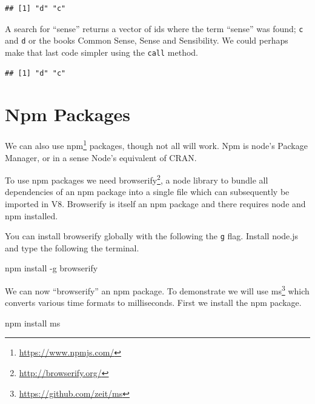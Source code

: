 \documentclass[
]{krantz}
\makeatletter
\newenvironment{Shaded}{\begin{snugshade}}{\end{snugshade}}
\newcommand{\ExtensionTok}[1]{#1}
\newcommand{\KeywordTok}[1]{\textcolor[rgb]{0.27,0.27,0.27}{\textbf{#1}}}
\newcommand{\NormalTok}[1]{#1}
\newcommand{\OperatorTok}[1]{\textcolor[rgb]{0.43,0.43,0.43}{\textbf{#1}}}
\newcommand{\StringTok}[1]{\textcolor[rgb]{0.5,0.5,0.5}{#1}}
\renewcommand{\href}[2]{#2\footnote{\url{#1}}}
\newenvironment{kframe}{%
\medskip{}
\setlength{\fboxsep}{.8em}
 \def\at@end@of@kframe{}%
 \ifinner\ifhmode%
  \def\at@end@of@kframe{\end{minipage}}%
  \begin{minipage}{\columnwidth}%
 \fi\fi%
 \def\FrameCommand##1{\hskip\@totalleftmargin \hskip-\fboxsep
 \colorbox{shadecolor}{##1}\hskip-\fboxsep
     \hskip-\linewidth \hskip-\@totalleftmargin \hskip\columnwidth}%
 \MakeFramed {\advance\hsize-\width
   \@totalleftmargin\z@ \linewidth\hsize
   \@setminipage}}%
 {\par\unskip\endMakeFramed%
 \at@end@of@kframe}
\renewenvironment{Shaded}{\begin{kframe}}{\end{kframe}}
\makeatother
\begin{document}
\begin{verbatim}
## [1] "d" "c"
\end{verbatim}

A search for ``sense'' returns a vector of ids where the term ``sense'' was found; \texttt{c} and \texttt{d} or the books Common Sense, Sense and Sensibility. We could perhaps make that last code simpler using the \texttt{call} method.

\begin{Shaded}
\end{Shaded}

\begin{verbatim}
## [1] "d" "c"
\end{verbatim}

\hypertarget{v8-npm}{%
\section{Npm Packages}\label{v8-npm}}

We can also use \href{https://www.npmjs.com/}{npm} packages, though not all will work. Npm is node's Package Manager, or in a sense Node's equivalent of CRAN.

To use npm packages we need \href{http://browserify.org/}{browserify}, a node library to bundle all dependencies of an npm package into a single file which can subsequently be imported in V8. Browserify is itself an npm package and there requires node and npm installed.

You can install browserify globally with the following the \texttt{g} flag. Install node.js and type the following the terminal.

\begin{Shaded}
\begin{Highlighting}[]
\ExtensionTok{npm}\NormalTok{ install {-}g browserify}
\end{Highlighting}
\end{Shaded}

We can now ``browserify'' an npm package. To demonstrate we will use \href{https://github.com/zeit/ms}{ms} which converts various time formats to milliseconds. First we install the npm package.

\begin{Shaded}
\begin{Highlighting}[]
\ExtensionTok{npm}\NormalTok{ install ms}
\end{Highlighting}
\end{Shaded}
\end{document}
